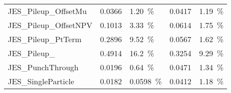 \begin{center}
\begin{tabular}{>{}m{5.0cm}>{}m{2.5cm}>{}m{2.0cm} >{}m{2.5cm}>{}m{1.0cm}}
JES_Pileup_OffsetMu & 0.0366 &  1.20~\% & 0.0417 &  1.19~\%\\

JES_Pileup_OffsetNPV & 0.1013 &  3.33~\% & 0.0614 &  1.75~\%\\


JES_Pileup_PtTerm & 0.2896 &  9.52~\% & 0.0567 &  1.62~\%\\

JES_Pileup_ & 0.4914 &  16.2~\% & 0.3254 &  9.29~\%\\


JES_PunchThrough & 0.0196 &  0.64~\% & 0.0471 &  1.34~\%\\

JES_SingleParticle  & 0.0182 &  0.0598~\%  &0.0412 &  1.18~\%\\
	\bottomrule
	\end{tabular}
	
\end{center}
